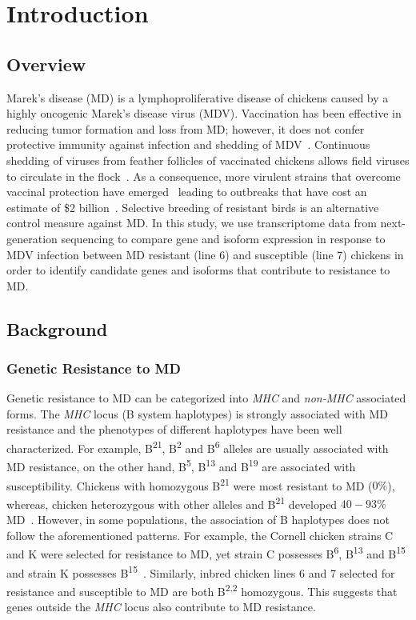 \chapter{Introduction}
\section{Overview}

Marek's disease (MD) is a lymphoproliferative disease of chickens
caused by a highly oncogenic Marek's disease virus (MDV).
Vaccination has been effective in reducing tumor formation and
loss from MD; however, it does not confer protective immunity
against infection and shedding of MDV~\cite{gimeno2008marek}.
Continuous shedding of viruses from feather follicles of
vaccinated chickens allows field viruses to circulate in the
flock~\cite{morrow2004marek}.  As a consequence, more virulent
strains that overcome vaccinal protection have
emerged~\cite{witter1998control,gimeno2008marek} leading to
outbreaks that have cost an estimate of \$2
billion~\cite{morrow2004marek}.  Selective breeding of resistant
birds is an alternative control measure against MD.  In this
study, we use transcriptome data from next-generation sequencing
to compare gene and isoform expression in response to MDV
infection between MD resistant (line 6) and susceptible (line 7)
chickens in order to identify candidate genes and isoforms that
contribute to resistance to MD.

\section{Background}
\subsection{Genetic Resistance to MD}

Genetic resistance to MD can be categorized into {\em MHC}
and {\em non-MHC} associated forms.  The {\em MHC} locus (B
system haplotypes) is strongly associated with MD resistance
and the phenotypes of different haplotypes have been well
characterized.  For example, B\textsuperscript{21},
B\textsuperscript{2} and B\textsuperscript{6} alleles are
usually associated with MD resistance, on the other hand,
B\textsuperscript{5}, B\textsuperscript{13} and
B\textsuperscript{19} are associated with susceptibility.
Chickens with homozygous B\textsuperscript{21} were most
resistant to MD ($0\%$), whereas, chicken heterozygous with
other alleles and B\textsuperscript{21} developed $40-93\%$
MD~\cite{briles1980identification}.  However, in some
populations, the association of B haplotypes does not follow
the aforementioned patterns. For example, the Cornell
chicken strains C and K were selected for resistance to MD,
yet strain C possesses B\textsuperscript{6},
B\textsuperscript{13} and B\textsuperscript{15} and strain K
possesses
B\textsuperscript{15}~\cite{bacon1987influence,briles1980identification}.
Similarly, inbred chicken lines 6 and 7 selected for
resistance and susceptible to MD are both
B\textsuperscript{2,2} homozygous.  This suggests that genes
outside the {\em MHC} locus also contribute to MD
resistance.

